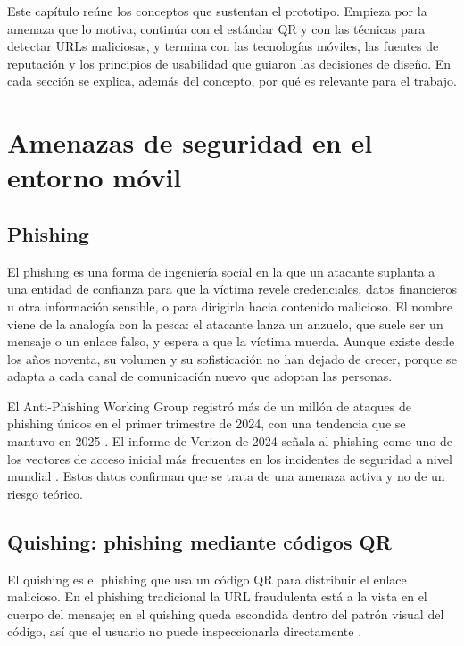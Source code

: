 \label{chap:marco}
Este capítulo reúne los conceptos que sustentan el prototipo. Empieza por la amenaza que lo motiva, continúa con el estándar QR y con las técnicas para detectar URLs maliciosas, y termina con las tecnologías móviles, las fuentes de reputación y los principios de usabilidad que guiaron las decisiones de diseño. En cada sección se explica, además del concepto, por qué es relevante para el trabajo.

\section{Amenazas de seguridad en el entorno móvil}

\subsection{Phishing}

El phishing es una forma de ingeniería social en la que un atacante suplanta a una entidad de confianza para que la víctima revele credenciales, datos financieros u otra información sensible, o para dirigirla hacia contenido malicioso. El nombre viene de la analogía con la pesca: el atacante lanza un anzuelo, que suele ser un mensaje o un enlace falso, y espera a que la víctima muerda. Aunque existe desde los años noventa, su volumen y su sofisticación no han dejado de crecer, porque se adapta a cada canal de comunicación nuevo que adoptan las personas.

El Anti-Phishing Working Group registró más de un millón de ataques de phishing únicos en el primer trimestre de 2024, con una tendencia que se mantuvo en 2025 \cite{apwg2024q1,apwg2025q1}. El informe de Verizon de 2024 señala al phishing como uno de los vectores de acceso inicial más frecuentes en los incidentes de seguridad a nivel mundial \cite{verizon2024dbir}. Estos datos confirman que se trata de una amenaza activa y no de un riesgo teórico.

\subsection{Quishing: phishing mediante códigos QR}

El quishing es el phishing que usa un código QR para distribuir el enlace malicioso. En el phishing tradicional la URL fraudulenta está a la vista en el cuerpo del mensaje; en el quishing queda escondida dentro del patrón visual del código, así que el usuario no puede inspeccionarla directamente \cite{insikt2024qrcode,unit42_2023qr}.

